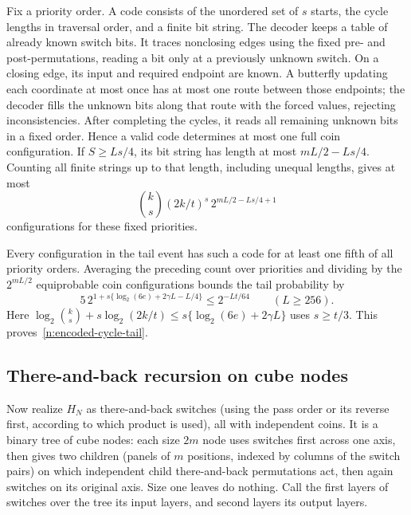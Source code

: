 Fix a priority order.  A code consists of the unordered set of $s$
starts, the cycle lengths in traversal order, and a finite bit string.
The decoder keeps a table of already known switch bits.  It traces
nonclosing edges using the fixed pre- and post-permutations, reading
a bit only at a previously unknown switch.  On a closing edge,
its input and required endpoint are known.  A butterfly updating
each coordinate at most once has at most one route between those
endpoints; the decoder fills the unknown bits along that route with
the forced values, rejecting inconsistencies.  After completing the
cycles, it reads all remaining unknown bits in a fixed order.
Hence a valid code determines at most one full coin configuration.
If $S\ge Ls/4$, its bit string has length at most $mL/2-Ls/4$.
Counting all finite strings up to that length, including unequal
lengths, gives at most
\[
 \binom ks(2k/t)^s\,2^{mL/2-Ls/4+1}
\]
configurations for these fixed priorities.

Every configuration in the tail event has such a code for at least
one fifth of all priority orders.  Averaging the preceding count
over priorities and dividing by the $2^{mL/2}$ equiprobable coin
configurations bounds the tail probability by
\[
 5\,2^{1+s\{\log_2(6e)+2\gamma L-L/4\}}
 \le 2^{-Lt/64}\qquad(L\ge256).
\]
Here
$\log_2\binom ks+s\log_2(2k/t)
 \le s\{\log_2(6e)+2\gamma L\}$ uses $s\ge t/3$.
This proves~\eqref{n:encoded-cycle-tail}.

\subsection{There-and-back recursion on cube nodes}
Now realize \(H_N\) as there-and-back switches (using the pass order or its reverse first, according to which product is used), all with independent coins. It is a binary tree of cube nodes: each size \(2m\) node uses switches first across one axis, then gives two children (panels of \(m\) positions, indexed by columns of the switch pairs) on which independent child there-and-back permutations act, then again switches on its original axis. Size one leaves do nothing. Call the first layers of switches over the tree its input layers, and second layers its output layers.

